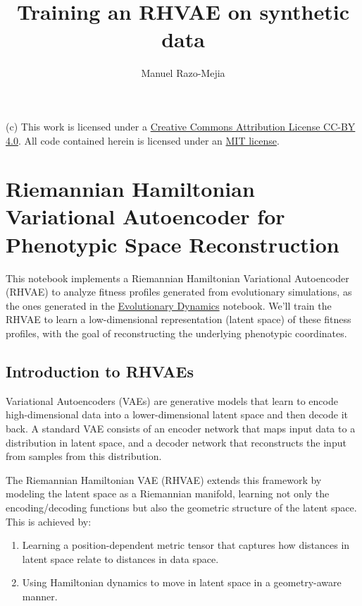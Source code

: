\documentclass[
]{scrartcl}
\title{Training an RHVAE on synthetic data}
\author[1]{Manuel Razo-Mejia}
\affil[1]{Department of Biology, Stanford University}
\date{}
\providecommand{\tightlist}{%
  \setlength{\itemsep}{0pt}\setlength{\parskip}{0pt}}\usepackage{longtable,booktabs,array}
\begin{document}
\linenumbers
\maketitle
(c) This work is licensed under a
\href{https://creativecommons.org/licenses/by/4.0/}{Creative Commons
Attribution License CC-BY 4.0}. All code contained herein is licensed
under an \href{https://opensource.org/licenses/MIT}{MIT license}.

\section{Riemannian Hamiltonian Variational Autoencoder for Phenotypic
Space
Reconstruction}\label{riemannian-hamiltonian-variational-autoencoder-for-phenotypic-space-reconstruction}

This notebook implements a Riemannian Hamiltonian Variational
Autoencoder (RHVAE) to analyze fitness profiles generated from
evolutionary simulations, as the ones generated in the
\href{evolutionary_dynamics.qmd}{Evolutionary Dynamics} notebook. We'll
train the RHVAE to learn a low-dimensional representation (latent space)
of these fitness profiles, with the goal of reconstructing the
underlying phenotypic coordinates.

\subsection{Introduction to RHVAEs}\label{introduction-to-rhvaes}

Variational Autoencoders (VAEs) are generative models that learn to
encode high-dimensional data into a lower-dimensional latent space and
then decode it back. A standard VAE consists of an encoder network that
maps input data to a distribution in latent space, and a decoder network
that reconstructs the input from samples from this distribution.

The Riemannian Hamiltonian VAE (RHVAE) extends this framework by
modeling the latent space as a Riemannian manifold, learning not only
the encoding/decoding functions but also the geometric structure of the
latent space. This is achieved by:

\begin{enumerate}
\def\labelenumi{\arabic{enumi}.}
\tightlist
\item
  Learning a position-dependent metric tensor that captures how
  distances in latent space relate to distances in data space.
\item
  Using Hamiltonian dynamics to move in latent space in a geometry-aware
  manner.
\end{enumerate}
\end{document}
